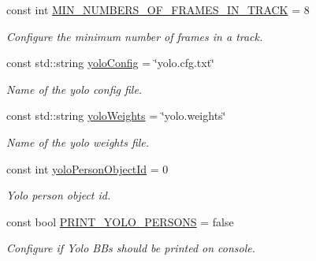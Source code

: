 \begin{DoxyCompactItemize}
const int \mbox{\hyperlink{namespacedto_1_1_configuration_aa40d3b001a3d55b47dc009c828c709c0}{M\+I\+N\+\_\+\+N\+U\+M\+B\+E\+R\+S\+\_\+\+O\+F\+\_\+\+F\+R\+A\+M\+E\+S\+\_\+\+I\+N\+\_\+\+T\+R\+A\+CK}} = 8
\begin{DoxyCompactList}\small\item\em Configure the minimum number of frames in a track. \end{DoxyCompactList}\item 
\mbox{\label{namespacedto_1_1_configuration_a347a738fd8a71e68a17d86d4ee3e099b}} 
const std\+::string \mbox{\hyperlink{namespacedto_1_1_configuration_a347a738fd8a71e68a17d86d4ee3e099b}{yolo\+Config}} = \char`\"{}yolo.\+cfg.\+txt\char`\"{}
\begin{DoxyCompactList}\small\item\em Name of the yolo config file. \end{DoxyCompactList}\item 
\mbox{\label{namespacedto_1_1_configuration_aca66c3bfe41a30367c64ad521e678c18}} 
const std\+::string \mbox{\hyperlink{namespacedto_1_1_configuration_aca66c3bfe41a30367c64ad521e678c18}{yolo\+Weights}} = \char`\"{}yolo.\+weights\char`\"{}
\begin{DoxyCompactList}\small\item\em Name of the yolo weights file. \end{DoxyCompactList}\item 
\mbox{\label{namespacedto_1_1_configuration_af7c509a80ed8f7e7360204d1a8b5f175}} 
const int \mbox{\hyperlink{namespacedto_1_1_configuration_af7c509a80ed8f7e7360204d1a8b5f175}{yolo\+Person\+Object\+Id}} = 0
\begin{DoxyCompactList}\small\item\em Yolo person object id. \end{DoxyCompactList}\item 
\mbox{\label{namespacedto_1_1_configuration_afbda2b4715f84f1f2ff2264a77449fd8}} 
const bool \mbox{\hyperlink{namespacedto_1_1_configuration_afbda2b4715f84f1f2ff2264a77449fd8}{P\+R\+I\+N\+T\+\_\+\+Y\+O\+L\+O\+\_\+\+P\+E\+R\+S\+O\+NS}} = false
\begin{DoxyCompactList}\small\item\em Configure if Yolo B\+Bs should be printed on console. \end{DoxyCompactList}\item 

\end{DoxyCompactItemize}
